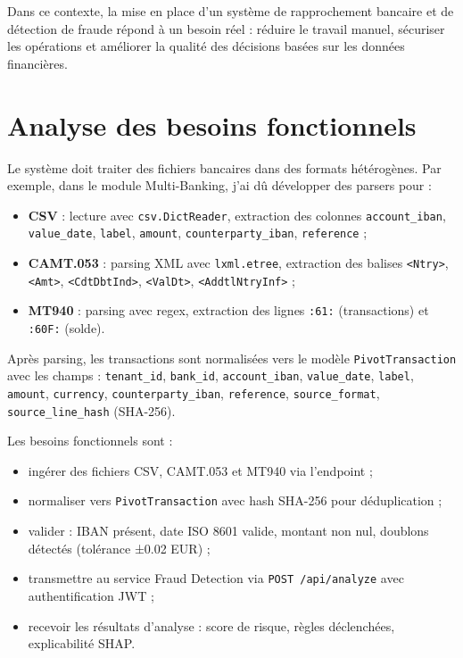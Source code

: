 \documentclass[12pt,a4paper]{extreport}
\begin{document}
Dans ce contexte, la mise en place d'un système de rapprochement bancaire et de détection de fraude répond à un besoin réel : réduire le travail manuel, sécuriser les opérations et améliorer la qualité des décisions basées sur les données financières.

\section{Analyse des besoins fonctionnels}

Le système doit traiter des fichiers bancaires dans des formats hétérogènes. Par exemple, dans le module Multi-Banking, j'ai dû développer des parsers pour :

\begin{itemize}
    \item \textbf{CSV} : lecture avec \texttt{csv.DictReader}, extraction des colonnes \texttt{account\_iban}, \texttt{value\_date}, \texttt{label}, \texttt{amount}, \texttt{counterparty\_iban}, \texttt{reference} ;
    \item \textbf{CAMT.053} : parsing XML avec \texttt{lxml.etree}, extraction des balises \texttt{<Ntry>}, \texttt{<Amt>}, \texttt{<CdtDbtInd>}, \texttt{<ValDt>}, \texttt{<AddtlNtryInf>} ;
    \item \textbf{MT940} : parsing avec regex, extraction des lignes \texttt{:61:} (transactions) et \texttt{:60F:} (solde).
\end{itemize}

Après parsing, les transactions sont normalisées vers le modèle \texttt{PivotTransaction} avec les champs : \texttt{tenant\_id}, \texttt{bank\_id}, \texttt{account\_iban}, \texttt{value\_date}, \texttt{label}, \texttt{amount}, \texttt{currency}, \texttt{counterparty\_iban}, \texttt{reference}, \texttt{source\_format}, \texttt{source\_line\_hash} (SHA-256).

Les besoins fonctionnels sont :

\begin{itemize}
    \item ingérer des fichiers CSV, CAMT.053 et MT940 via l'endpoint  ;
    \item normaliser vers \texttt{PivotTransaction} avec hash SHA-256 pour déduplication ;
    \item valider : IBAN présent, date ISO 8601 valide, montant non nul, doublons détectés (tolérance ±0.02 EUR) ;
    \item transmettre au service Fraud Detection via \texttt{POST /api/analyze} avec authentification JWT ;
    \item recevoir les résultats d'analyse : score de risque, règles déclenchées, explicabilité SHAP.
\end{itemize}
\end{document}
